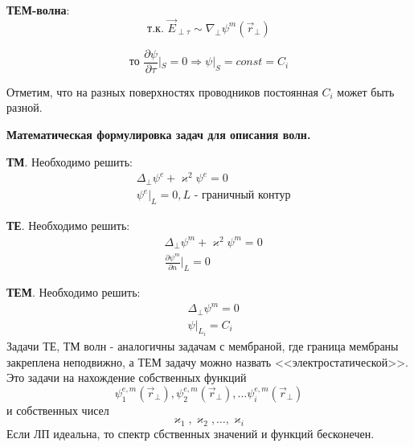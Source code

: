 \textbf{ТЕМ-волна}:
\begin{equation}
  \text{т.к. }\vec{E}_{\perp \tau}\sim \nabla_{\perp} \psi^m(\vec{r}_{\perp}) 
\end{equation}

\begin{equation}
  \text{то }\frac{\partial \psi}{\partial \tau}|_S = 0 \Rightarrow \psi|_S = const = C_i
\end{equation}

Отметим, что на разных поверхностях проводников постоянная $C_i$ может быть разной.

\textbf{Математическая формулировка задач для описания волн.}

\textbf{ТМ}. Необходимо решить:
\begin{align*}
  &\Delta_{\perp}\psi^{e}+\varkappa^2\psi^{e}=0\\
  &\psi^e|_L = 0 , \text{$L$ - граничный контур}
\end{align*}

\textbf{ТЕ}. Необходимо решить:
\begin{align*}
  &\Delta_{\perp}\psi^{m}+\varkappa^2\psi^{m}=0\\
  &\frac{\partial \psi^m}{\partial n}|_L = 0
\end{align*}

\textbf{ТЕМ}. Необходимо решить:
\begin{align*}
  &\Delta_{\perp}\psi^{m}=0\\
  &\psi|_{L_i} = C_i
\end{align*}
Задачи ТЕ, ТМ волн - аналогичны задачам с мембраной, где граница мембраны закреплена неподвижно, а ТЕМ задачу можно
назвать <<электростатической>>.
Это задачи на нахождение собственных функций
\begin{equation}
  \psi^{e,m}_1(\vec{r}_{\perp}),\psi^{e,m}_2(\vec{r}_{\perp}),\dots \psi^{e,m}_i(\vec{r}_{\perp})      
\end{equation}
и собственных чисел 
\begin{equation}
\varkappa_1,\varkappa_2,\dots,\varkappa_i  
\end{equation}
Если ЛП идеальна, то спектр сбственных значений и функций бесконечен.